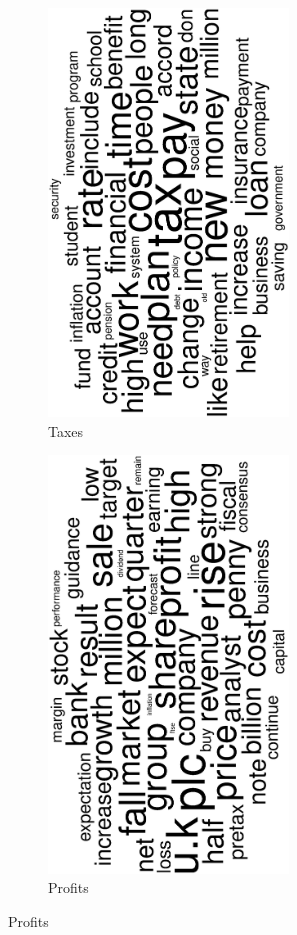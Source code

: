 \begin{figure}
\begin{subfigure}{0.32\textwidth}
		\includegraphics[width=0.7\textwidth,angle=270]{figures/wordcloud13.eps}
		\caption{Taxes}
	\end{subfigure}
	\begin{subfigure}{0.32\textwidth}
		\includegraphics[width=0.7\textwidth,angle=270]{figures/wordcloud10.eps}
		\caption{Profits}
	\end{subfigure}


\end{figure}
